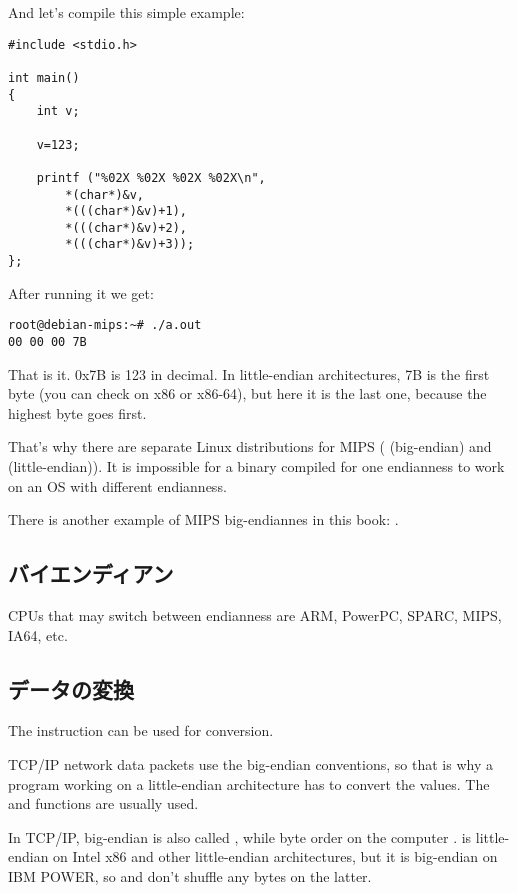 And let's compile this simple example:

\begin{lstlisting}[style=customc]
#include <stdio.h>

int main()
{
	int v;

	v=123;

	printf ("%02X %02X %02X %02X\n", 
		*(char*)&v,
		*(((char*)&v)+1),
		*(((char*)&v)+2),
		*(((char*)&v)+3));
};
\end{lstlisting}

After running it we get:

\begin{lstlisting}
root@debian-mips:~# ./a.out 
00 00 00 7B
\end{lstlisting}

That is it.
0x7B is 123 in decimal.
In little-endian architectures, 7B is the first byte (you can check on x86 or x86-64), 
but here it is the last one, because the highest byte goes first.

That's why there are separate Linux distributions for MIPS
( (big-endian) and  (little-endian)).
It is impossible for a binary compiled for one endianness to work on an \ac{OS} with different endianness. 

There is another example of MIPS big-endiannes in this book: .

\subsection{バイエンディアン}

CPUs that may switch between endianness are ARM, PowerPC, SPARC, MIPS, \ac{IA64}, etc.

\subsection{データの変換}

The  instruction can be used for conversion.

TCP/IP network data packets use the big-endian conventions, so that is why a program working on a little-endian architecture
has to convert the values.
The  and  functions are usually used.

In TCP/IP, big-endian is also called , while byte order on the computer .
 is little-endian on Intel x86 and other little-endian architectures,
but it is big-endian on IBM POWER, so  and  don't shuffle any bytes on the latter.

